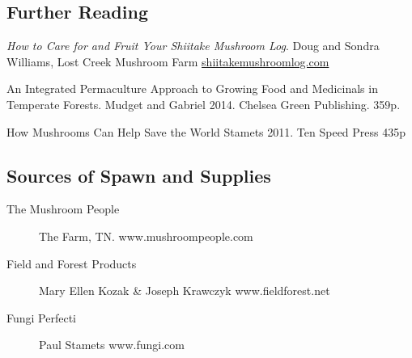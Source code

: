 \documentclass{tufte-handout}
\begin{document}

\subsection{Further Reading}
\begin{description}
\item \emph{How to Care for and Fruit Your Shiitake Mushroom Log}. Doug and Sondra Williams, Lost Creek Mushroom Farm \href{http://shiitakemushroomlog.com/care&handling.html}{shiitakemushroomlog.com}
\item[Farming the Woods:] An Integrated Permaculture Approach to Growing Food and Medicinals in Temperate Forests. Mudget and Gabriel 2014.  Chelsea Green Publishing. 359p.
\item[Mycelium Running:] How Mushrooms Can Help Save the World Stamets 2011. Ten Speed Press 435p
\end{description}

\subsection{Sources of Spawn and Supplies}

\begin{description}
\item[The Mushroom People] The Farm, TN. %
www.mushroompeople.com
\item[Field and Forest Products] Mary Ellen Kozak \& Joseph Krawczyk 
www.fieldforest.net
\item[Fungi Perfecti] Paul Stamets 
www.fungi.com
\end{description}

\end{document}
